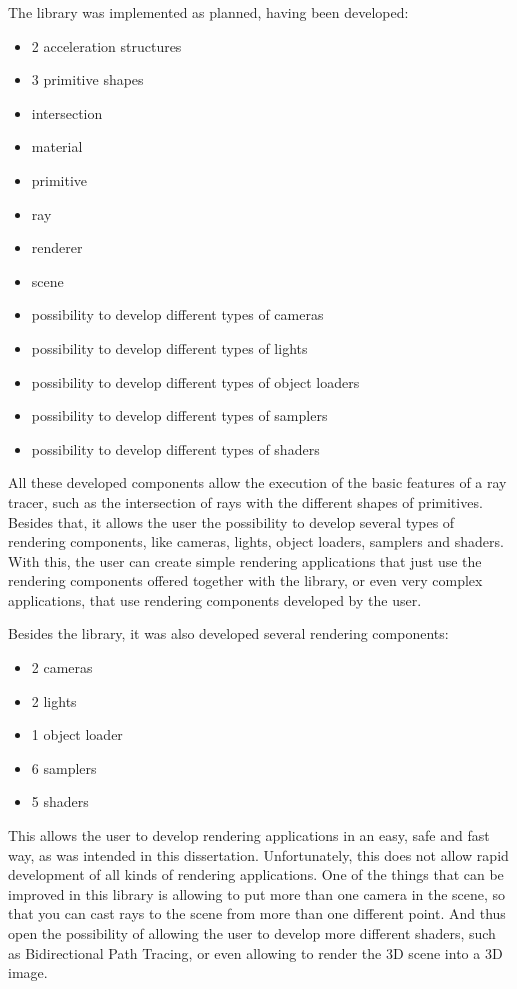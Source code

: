 \par
The library was implemented as planned, having been developed:


\begin{itemize}
	\item 2 acceleration structures
	\item 3 primitive shapes
	\item intersection
	\item material
	\item primitive
	\item ray
	\item renderer
	\item scene
	\item possibility to develop different types of cameras
	\item possibility to develop different types of lights
	\item possibility to develop different types of object loaders
	\item possibility to develop different types of samplers
	\item possibility to develop different types of shaders
\end{itemize}

\par
All these developed components allow the execution of the basic features of a ray tracer, such as the intersection of rays with the different shapes of primitives.
Besides that, it allows the user the possibility to develop several types of rendering components, like cameras, lights, object loaders, samplers and shaders.
With this, the user can create simple rendering applications that just use the rendering components offered together with the library, or even very complex applications, that use rendering components developed by the user.

\par
Besides the library, it was also developed several rendering components:

\begin{itemize}
	\item 2 cameras
	\item 2 lights
	\item 1 object loader
	\item 6 samplers
	\item 5 shaders
\end{itemize}

\par
This allows the user to develop rendering applications in an easy, safe and fast way, as was intended in this dissertation.
Unfortunately, this does not allow rapid development of all kinds of rendering applications.
One of the things that can be improved in this library is allowing to put more than one camera in the scene, so that you can cast rays to the scene from more than one different point.
And thus open the possibility of allowing the user to develop more different shaders, such as Bidirectional Path Tracing, or even allowing to render the 3D scene into a 3D image.